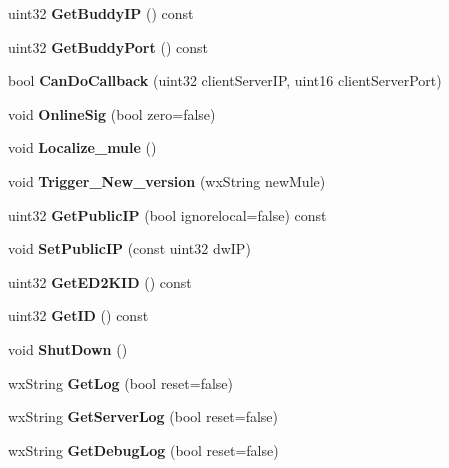 \begin{DoxyCompactItemize}
\item 
uint32 {\bfseries GetBuddyIP} () const \label{classCamuleApp_a5f8e1b82f113c7fc87f38abb34a8df40}

\item 
uint32 {\bfseries GetBuddyPort} () const \label{classCamuleApp_a3c8e8cf3b1e41cb93b52e62b4e7b4461}

\item 
bool {\bfseries CanDoCallback} (uint32 clientServerIP, uint16 clientServerPort)\label{classCamuleApp_aae59ddb96c26b12d82218c3480322adb}

\item 
void {\bfseries OnlineSig} (bool zero=false)\label{classCamuleApp_a8a1ac7f0d839d0c9283162f114173a96}

\item 
void {\bfseries Localize\_\-mule} ()\label{classCamuleApp_aaf0adec0ba6d4794d42d21d50a2924c3}

\item 
void {\bfseries Trigger\_\-New\_\-version} (wxString newMule)\label{classCamuleApp_a0ae7f40aace2550da5835ada449ca046}

\item 
uint32 {\bfseries GetPublicIP} (bool ignorelocal=false) const \label{classCamuleApp_ad8b4ed8c731426af1e56d26f65409460}

\item 
void {\bfseries SetPublicIP} (const uint32 dwIP)\label{classCamuleApp_afb1c66018b0310b1e320751936e8d587}

\item 
uint32 {\bfseries GetED2KID} () const \label{classCamuleApp_a743514ad9b45d3b04c9adcf3d415bf35}

\item 
uint32 {\bfseries GetID} () const \label{classCamuleApp_ab2d1388a902652cb279f4bdb03dc8801}

\item 
void {\bfseries ShutDown} ()\label{classCamuleApp_a60f376e8cf971cad36c4232b517d8204}

\item 
wxString {\bfseries GetLog} (bool reset=false)\label{classCamuleApp_a78cf2186c359a0bb288534217a41a9a5}

\item 
wxString {\bfseries GetServerLog} (bool reset=false)\label{classCamuleApp_aeee2bfccd24c0652753867195fdb8618}

\item 
wxString {\bfseries GetDebugLog} (bool reset=false)\label{classCamuleApp_acc0b1b818d5855b99734ed95b7eca837}


\end{DoxyCompactItemize}
